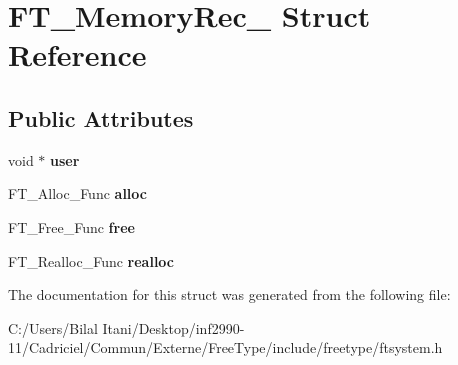 \hypertarget{struct_f_t___memory_rec__}{}\section{F\+T\+\_\+\+Memory\+Rec\+\_\+ Struct Reference}
\label{struct_f_t___memory_rec__}
\subsection*{Public Attributes}
\begin{DoxyCompactItemize}
\item 
void $\ast$ {\bfseries user}\hypertarget{struct_f_t___memory_rec___aae5bc614434ba4525e37d7faaf03c4b7}{}\label{struct_f_t___memory_rec___aae5bc614434ba4525e37d7faaf03c4b7}

\item 
F\+T\+\_\+\+Alloc\+\_\+\+Func {\bfseries alloc}\hypertarget{struct_f_t___memory_rec___a2269eada6afbb008fe5c73707145410c}{}\label{struct_f_t___memory_rec___a2269eada6afbb008fe5c73707145410c}

\item 
F\+T\+\_\+\+Free\+\_\+\+Func {\bfseries free}\hypertarget{struct_f_t___memory_rec___a83ab2422bd9265d8731b9e5e368ba240}{}\label{struct_f_t___memory_rec___a83ab2422bd9265d8731b9e5e368ba240}

\item 
F\+T\+\_\+\+Realloc\+\_\+\+Func {\bfseries realloc}\hypertarget{struct_f_t___memory_rec___a5ce3424cc72e898fe973ffeabe44a95c}{}\label{struct_f_t___memory_rec___a5ce3424cc72e898fe973ffeabe44a95c}

\end{DoxyCompactItemize}


The documentation for this struct was generated from the following file\+:\begin{DoxyCompactItemize}
\item 
C\+:/\+Users/\+Bilal Itani/\+Desktop/inf2990-\/11/\+Cadriciel/\+Commun/\+Externe/\+Free\+Type/include/freetype/ftsystem.\+h\end{DoxyCompactItemize}
